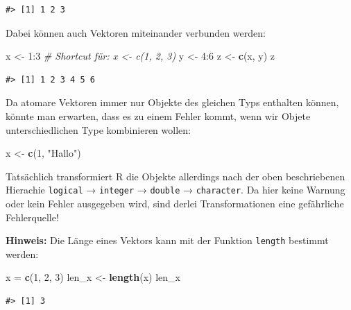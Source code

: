\documentclass[]{tufte-book}
\newenvironment{Shaded}{}{}
\newcommand{\KeywordTok}[1]{\textcolor[rgb]{0.00,0.44,0.13}{\textbf{#1}}}
\newcommand{\DecValTok}[1]{\textcolor[rgb]{0.25,0.63,0.44}{#1}}
\newcommand{\StringTok}[1]{\textcolor[rgb]{0.25,0.44,0.63}{#1}}
\newcommand{\CommentTok}[1]{\textcolor[rgb]{0.38,0.63,0.69}{\textit{#1}}}
\newcommand{\OperatorTok}[1]{\textcolor[rgb]{0.40,0.40,0.40}{#1}}
\newcommand{\NormalTok}[1]{#1}
\begin{document}
\begin{verbatim}
#> [1] 1 2 3
\end{verbatim}

Dabei können auch Vektoren miteinander verbunden werden:

\begin{Shaded}
\begin{Highlighting}[]
\NormalTok{x <-}\StringTok{ }\DecValTok{1}\OperatorTok{:}\DecValTok{3}  \CommentTok{# Shortcut für: x <- c(1, 2, 3)}
\NormalTok{y <-}\StringTok{ }\DecValTok{4}\OperatorTok{:}\DecValTok{6}
\NormalTok{z <-}\StringTok{ }\KeywordTok{c}\NormalTok{(x, y)}
\NormalTok{z}
\end{Highlighting}
\end{Shaded}

\begin{verbatim}
#> [1] 1 2 3 4 5 6
\end{verbatim}

Da atomare Vektoren immer nur Objekte des gleichen Typs enthalten
können, könnte man erwarten, dass es zu einem Fehler kommt, wenn wir
Objete unterschiedlichen Type kombinieren wollen:

\begin{Shaded}
\begin{Highlighting}[]
\NormalTok{x <-}\StringTok{ }\KeywordTok{c}\NormalTok{(}\DecValTok{1}\NormalTok{, }\StringTok{"Hallo"}\NormalTok{)}
\end{Highlighting}
\end{Shaded}

Tatsächlich transformiert R die Objekte allerdings nach der oben
beschriebenen Hierachie \texttt{logical} → \texttt{integer} →
\texttt{double} → \texttt{character}. Da hier keine Warnung oder kein
Fehler ausgegeben wird, sind derlei Transformationen eine gefährliche
Fehlerquelle!

\textbf{Hinweis:} Die Länge eines Vektors kann mit der Funktion
\texttt{length} bestimmt werden:

\begin{Shaded}
\begin{Highlighting}[]
\NormalTok{x =}\StringTok{ }\KeywordTok{c}\NormalTok{(}\DecValTok{1}\NormalTok{, }\DecValTok{2}\NormalTok{, }\DecValTok{3}\NormalTok{)}
\NormalTok{len_x <-}\StringTok{ }\KeywordTok{length}\NormalTok{(x)}
\NormalTok{len_x}
\end{Highlighting}
\end{Shaded}

\begin{verbatim}
#> [1] 3
\end{verbatim}
\end{document}
